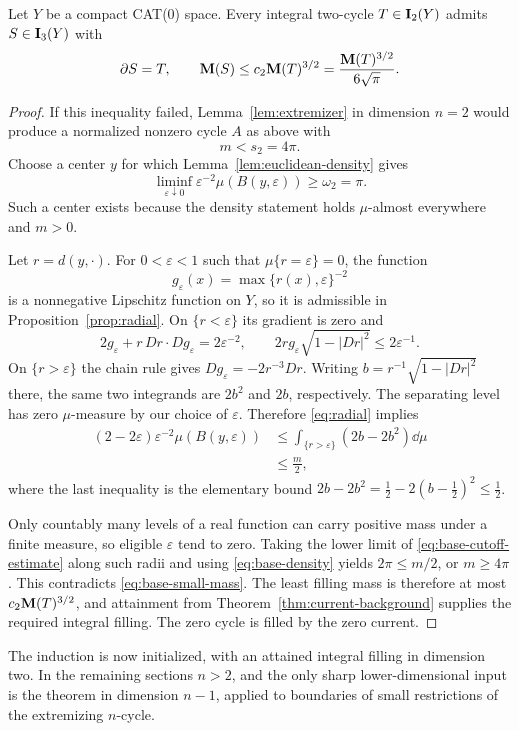 \begin{proposition}
\label{prop:base}
Let $Y$ be a compact CAT(0) space.  Every integral two-cycle
$T\in\mathbf I_2(Y)$ admits $S\in\mathbf I_3(Y)$ with
\[
 \partial S=T,\qquad
 \mathbf M(S)\leq c_2\mathbf M(T)^{3/2}
          =\frac{\mathbf M(T)^{3/2}}{6\sqrt{\pi}}.
\]
\end{proposition}

\begin{proof}
If this inequality failed, Lemma~\ref{lem:extremizer} in dimension
$n=2$ would produce a normalized nonzero cycle $A$ as above with
\begin{equation}
 m<s_2=4\pi.
 \label{eq:base-small-mass}
\end{equation}
Choose a center $y$ for which Lemma~\ref{lem:euclidean-density}
gives
\begin{equation}
 \liminf_{\varepsilon\downarrow0}
 \varepsilon^{-2}\mu(B(y,\varepsilon))\geq\omega_2=\pi.
 \label{eq:base-density}
\end{equation}
Such a center exists because the density statement holds
$\mu$-almost everywhere and $m>0$.

Let $r=d(y,\cdot)$.  For $0<\varepsilon<1$ such that
$\mu\{r=\varepsilon\}=0$, the function
\[
 g_\varepsilon(x)=\max\{r(x),\varepsilon\}^{-2}
\]
is a nonnegative Lipschitz function on $Y$, so it is admissible
in Proposition~\ref{prop:radial}.  On $\{r<\varepsilon\}$ its
gradient is zero and
\[
 2g_\varepsilon+r\,Dr\cdot Dg_\varepsilon
 =2\varepsilon^{-2},\qquad
 2rg_\varepsilon\sqrt{1-|Dr|^2}
 \leq 2\varepsilon^{-1}.
\]
On $\{r>\varepsilon\}$ the chain rule gives
$Dg_\varepsilon=-2r^{-3}Dr$.  Writing
$b=r^{-1}\sqrt{1-|Dr|^2}$ there, the same two integrands are
$2b^2$ and $2b$, respectively.  The separating level has zero
$\mu$-measure by our choice of $\varepsilon$.  Therefore
\eqref{eq:radial} implies
\begin{align}
 (2-2\varepsilon)\varepsilon^{-2}\mu(B(y,\varepsilon))
 &\leq\int_{\{r>\varepsilon\}}(2b-2b^2)\dd\mu\\
 &\leq \frac{m}{2},
 \label{eq:base-cutoff-estimate}
\end{align}
where the last inequality is the elementary bound
$2b-2b^2=\tfrac12-2(b-\tfrac12)^2\leq\tfrac12$.

Only countably many levels of a real function can carry positive
mass under a finite measure, so eligible $\varepsilon$ tend to
zero.  Taking the lower limit of
\eqref{eq:base-cutoff-estimate} along such radii and using
\eqref{eq:base-density} yields $2\pi\leq m/2$, or $m\geq4\pi$.
This contradicts \eqref{eq:base-small-mass}.  The least filling
mass is therefore at most $c_2\mathbf M(T)^{3/2}$, and attainment from
Theorem~\ref{thm:current-background} supplies the required
integral filling.  The zero cycle is filled by the zero current.
\end{proof}

The induction is now initialized, with an attained integral filling in
dimension two. In the remaining sections $n>2$, and the only sharp
lower-dimensional input is the theorem in dimension $n-1$, applied to
boundaries of small restrictions of the extremizing $n$-cycle.
